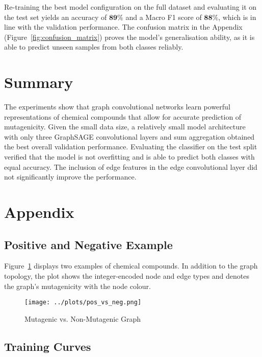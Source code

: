 \documentclass[10pt,conference,compsocconf]{IEEEtran}
\begin{document}
Re-training the best model configuration on the full dataset and evaluating it
on the test set yields an accuracy of $\mathbf{89\%}$ and a Macro F1 score of
$\mathbf{88\%}$, which is in line with the validation performance. The confusion
matrix in the Appendix (Figure~\ref{fig:confusion_matrix}) proves the model's
generalisation ability, as it is able to predict unseen samples from both
classes reliably.


\section{Summary}

The experiments show that graph convolutional networks learn powerful
representations of chemical compounds that allow for accurate prediction of
mutagenicity. Given the small data size, a relatively small model architecture
with only three GraphSAGE convolutional layers and sum aggregation obtained the
best overall validation performance. Evaluating the classifier on the test split
verified that the model is not overfitting and is able to predict both classes
with equal accuracy. The inclusion of edge features in the edge convolutional
layer did not significantly improve the performance.

\newpage



\section{Appendix}

\subsection{Positive and Negative Example}

Figure~\ref{fig:pos_vs_neg_example} displays two examples of chemical compounds.
In addition to the graph topology, the plot shows the integer-encoded node and
edge types and denotes the graph's mutagenicity with the node colour.

\begin{figure}[h!]
  \texttt{[image: ../plots/pos\_vs\_neg.png]}
  \caption{Mutagenic vs. Non-Mutagenic Graph}
  \label{fig:pos_vs_neg_example}
\end{figure}

\subsection{Training Curves}
\end{document}

